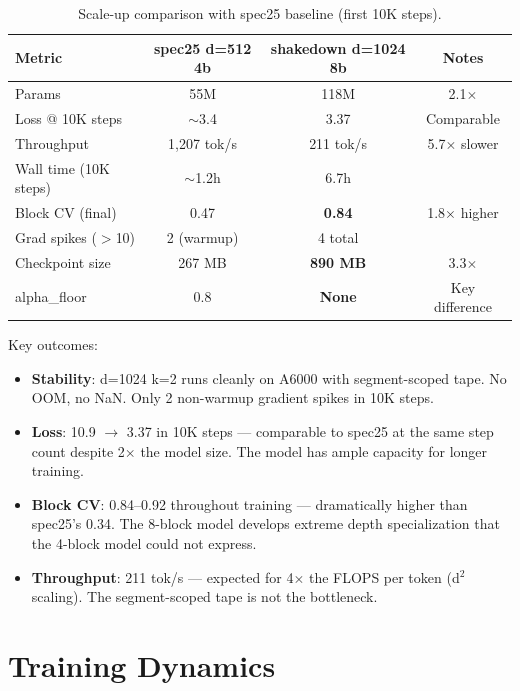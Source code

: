 \documentclass[11pt,a4paper]{article}
\begin{document}
\begin{table}[H]
\centering
\caption{Scale-up comparison with spec25 baseline (first 10K steps).}
\begin{tabular}{lccc}
\toprule
\textbf{Metric} & \textbf{spec25 d=512 4b} & \textbf{shakedown d=1024 8b} & \textbf{Notes} \\
\midrule
Params & 55M & 118M & 2.1$\times$ \\
Loss @ 10K steps & $\sim$3.4 & 3.37 & Comparable \\
Throughput & 1,207 tok/s & 211 tok/s & 5.7$\times$ slower \\
Wall time (10K steps) & $\sim$1.2h & 6.7h & \\
Block CV (final) & 0.47 & \textbf{0.84} & 1.8$\times$ higher \\
Grad spikes ($>$10) & 2 (warmup) & 4 total & \\
Checkpoint size & 267 MB & \textbf{890 MB} & 3.3$\times$ \\
alpha\_floor & 0.8 & \textbf{None} & Key difference \\
\bottomrule
\end{tabular}
\end{table}

\noindent Key outcomes:
\begin{itemize}
    \item \textbf{Stability}: d=1024 k=2 runs cleanly on A6000 with segment-scoped tape. No OOM, no NaN. Only 2 non-warmup gradient spikes in 10K steps.
    \item \textbf{Loss}: 10.9 $\to$ 3.37 in 10K steps --- comparable to spec25 at the same step count despite 2$\times$ the model size. The model has ample capacity for longer training.
    \item \textbf{Block CV}: 0.84--0.92 throughout training --- dramatically higher than spec25's 0.34. The 8-block model develops extreme depth specialization that the 4-block model could not express.
    \item \textbf{Throughput}: 211 tok/s --- expected for 4$\times$ the FLOPS per token (d$^2$ scaling). The segment-scoped tape is not the bottleneck.
\end{itemize}

\section{Training Dynamics}
\end{document}

